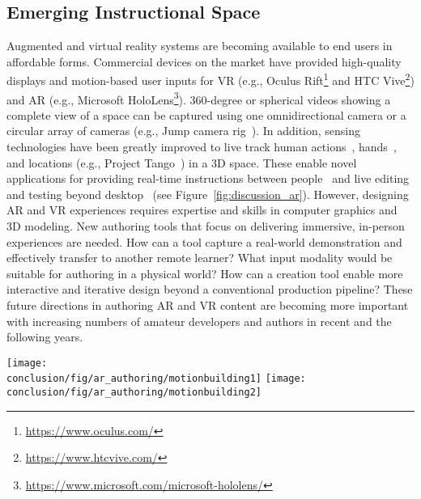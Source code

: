\subsection{Emerging Instructional Space}
Augmented and virtual reality systems are becoming available to end users in affordable forms. Commercial devices on the market have provided high-quality displays and motion-based user inputs for VR (e.g., Oculus Rift\footnote{\url{https://www.oculus.com/}} and HTC Vive\footnote{\url{https://www.htcvive.com/}}) and AR (e.g., Microsoft HoloLens\footnote{\url{https://www.microsoft.com/microsoft-hololens/}}). 360-degree or spherical videos showing a complete view of a space can be captured using one omnidirectional camera or a circular array of cameras (e.g., Jump camera rig~\cite{GoogleJump}).
%
In addition, sensing technologies have been greatly improved to live track human actions~\cite{dou-siggraph2016}, hands~\cite{taylor-siggraph2016}, and locations (e.g., Project Tango~\cite{GoogleTango}) in a 3D space.
%
These enable novel applications for providing real-time instructions between people~\cite{Gurevich:2012ko,MicrosoftHoloLensSkype} and live editing and testing beyond desktop~\cite{MotionBuilderAR} (see Figure~\ref{fig:discussion_ar}).
%
However, designing AR and VR experiences requires expertise and skills in computer graphics and 3D modeling. New authoring tools that focus on delivering immersive, in-person experiences are needed.
How can a tool capture a real-world demonstration and effectively transfer to another remote learner? What input modality would be suitable for authoring in a physical world? How can a creation tool enable more interactive and iterative design beyond a conventional production pipeline?
%
These future directions in authoring AR and VR content are becoming more important with increasing numbers of amateur developers and authors in recent and the following years.

\begin{figure*}[t!]
  \centering
  \texttt{[image: \\conclusion/fig/ar\_authoring/motionbuilding1]}
  \texttt{[image: \\conclusion/fig/ar\_authoring/motionbuilding2]}
  \caption{
    A recent Augmented Reality (AR) application enables reviewing character animation beyond a desktop in a room-size environment~\cite{MotionBuilderAR}, licensed under CC BY 2.0.
  }
  \label{fig:discussion_ar}
\end{figure*}

\clearpage


